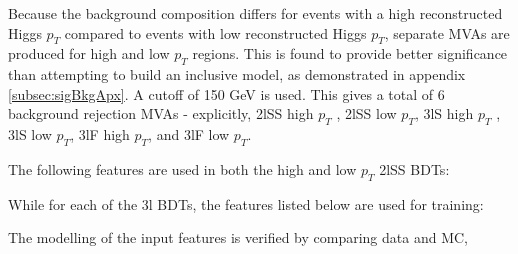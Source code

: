 Because the background composition differs for events with a high reconstructed Higgs $p_T$ compared to events with low reconstructed Higgs $p_T$, separate MVAs are produced for high and low $p_T$ regions. This is found to provide better significance than attempting to build an inclusive model, as demonstrated in appendix \ref{subsec:sigBkgApx}. A cutoff of 150 GeV is used. This gives a total of 6 background rejection MVAs - explicitly, 2lSS high $p_T$ , 2lSS low $p_T$, 3lS high $p_T$ , 3lS low $p_T$, 3lF high $p_T$, and 3lF low $p_T$.

The following features are used in both the high and low $p_T$ 2lSS BDTs:



While for each of the 3l BDTs, the features listed below are used for training:



The modelling of the input features is verified by comparing data and MC, 

\begin{figure}[H]
  \\
  \\
  \\
  \caption{}
  \label{}
\end{figure}

